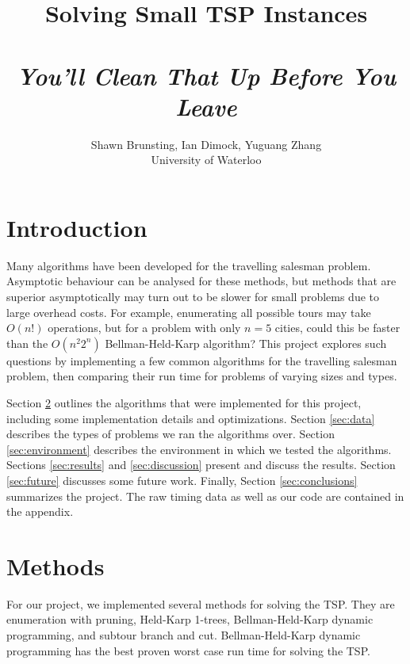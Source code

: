 \documentclass[11pt]{article}
\begin{document}
	
	\thispagestyle{empty}
	
	\title{Solving Small TSP Instances \\ ~ \\ \textit{You'll Clean That Up Before You Leave}}
	
	\author{Shawn Brunsting, Ian Dimock, Yuguang Zhang \\ University of Waterloo}
	
	\maketitle
	
	
	\section{Introduction}
	
	Many algorithms have been developed for the travelling salesman problem. Asymptotic behaviour can be analysed for these methods, but methods that are superior asymptotically may turn out to be slower for small problems due to large overhead costs. For example, enumerating all possible tours may take $O(n!)$ operations, but for a problem with only $n=5$ cities, could this be faster than the $O(n^2 2^n)$ Bellman-Held-Karp algorithm? This project explores such questions by implementing a few common algorithms for the travelling salesman problem, then comparing their run time for problems of varying sizes and types.
	
	Section \ref{sec:methods} outlines the algorithms that were implemented for this project, including some implementation details and optimizations. Section \ref{sec:data} describes the types of problems we ran the algorithms over. Section \ref{sec:environment} describes the environment in which we tested the algorithms. Sections \ref{sec:results} and \ref{sec:discussion} present and discuss the results. Section \ref{sec:future} discusses some future work. Finally, Section \ref{sec:conclusions} summarizes the project. The raw timing data as well as our code are contained in the appendix.
	
	\section{Methods}
	\label{sec:methods}
	For our project, we implemented several methods for solving the TSP. They are enumeration with pruning, Held-Karp 1-trees, Bellman-Held-Karp dynamic programming, and subtour branch and cut. Bellman-Held-Karp dynamic programming has the best proven worst case run time for solving the TSP. 
\end{document}
